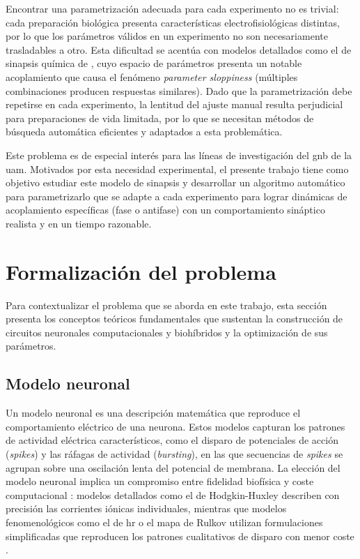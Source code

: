 Encontrar una parametrización adecuada para cada experimento no es trivial: cada preparación biológica presenta características electrofisiológicas distintas, por lo que los parámetros válidos en un experimento no son necesariamente trasladables a otro. Esta dificultad se acentúa con modelos detallados como el de sinapsis química de \cite{Golowasch1999}, cuyo espacio de parámetros presenta un notable acoplamiento que causa el fenómeno \textit{parameter sloppiness} \cite{Gutenkunst2007} (múltiples combinaciones producen respuestas similares). Dado que la parametrización debe repetirse en cada experimento, la lentitud del ajuste manual resulta perjudicial para preparaciones de vida limitada, por lo que se necesitan métodos de búsqueda automática eficientes y adaptados a esta problemática.

Este problema es de especial interés para las líneas de investigación del \ac{gnb} de la \ac{uam}. Motivados por esta necesidad experimental, el presente trabajo tiene como objetivo estudiar este modelo de sinapsis \cite{Golowasch1999} y desarrollar un algoritmo automático para parametrizarlo que se adapte a cada experimento para lograr dinámicas de acoplamiento específicas (fase o antifase) con un comportamiento sináptico realista y en un tiempo razonable.


\section{Formalización del problema\label{SEC:FORMALIZACION}}

Para contextualizar el problema que se aborda en este trabajo, esta sección presenta los conceptos teóricos fundamentales que sustentan la construcción de circuitos neuronales computacionales y biohíbridos y la optimización de sus parámetros.

\subsection{Modelo neuronal\label{SS:MODELONEURONAL}}

Un modelo neuronal es una descripción matemática que reproduce el comportamiento eléctrico de una neurona. Estos modelos capturan los patrones de actividad eléctrica característicos, como el disparo de potenciales de acción (\textit{spikes}) y las ráfagas de actividad (\textit{bursting}), en las que secuencias de \textit{spikes} se agrupan sobre una oscilación lenta del potencial de membrana. La elección del modelo neuronal implica un compromiso entre fidelidad biofísica y coste computacional \cite{Torres2012}: modelos detallados como el de Hodgkin-Huxley \cite{Hodgkin1952} describen con precisión las corrientes iónicas individuales, mientras que modelos fenomenológicos como el de \ac{hr} \cite{Hindmarsh1984} o el mapa de Rulkov \cite{Rulkov2002} utilizan formulaciones simplificadas que reproducen los patrones cualitativos de disparo con menor coste \cite{Fortuna2023}.

